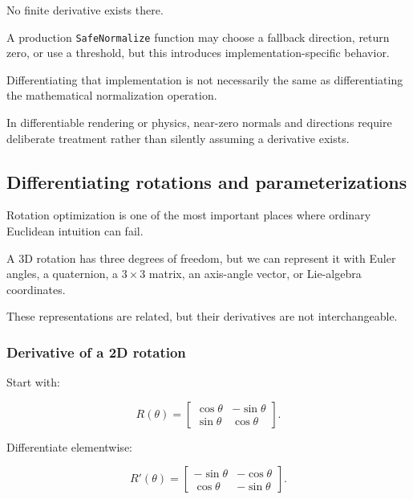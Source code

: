 No finite derivative exists there.

A production \texttt{SafeNormalize} function may choose a fallback direction, return zero, or use a threshold, but this introduces implementation-specific behavior.

Differentiating that implementation is not necessarily the same as differentiating the mathematical normalization operation.

In differentiable rendering or physics, near-zero normals and directions require deliberate treatment rather than silently assuming a derivative exists.

\subsection{Differentiating rotations and parameterizations}\label{02-foundations-ii-ch027-differentiating-rotations-and-parameterizations}

\hypertarget{02-foundations-ii-ch027-differentiating-rotations-and-parameterizations}{}

Rotation optimization is one of the most important places where ordinary Euclidean intuition can fail.

A 3D rotation has three degrees of freedom, but we can represent it with Euler angles, a quaternion, a \(3\times3\) matrix, an axis-angle vector, or Lie-algebra coordinates.

These representations are related, but their derivatives are not interchangeable.

\subsubsection{Derivative of a 2D rotation}\label{02-foundations-ii-ch027-derivative-of-a-2d-rotation}

\hypertarget{02-foundations-ii-ch027-derivative-of-a-2d-rotation}{}

Start with:

\[
R(\theta)= \begin{bmatrix} \cos\theta&-\sin\theta\\ \sin\theta&\cos\theta \end{bmatrix}.
\]

Differentiate elementwise:

\[
\boxed{ R'(\theta)= \begin{bmatrix} -\sin\theta&-\cos\theta\\ \cos\theta&-\sin\theta \end{bmatrix} }.
\]

